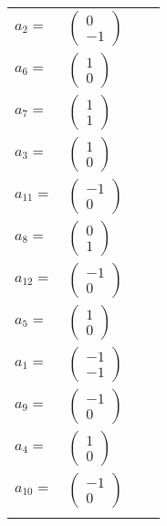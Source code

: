 \documentclass[1p]{elsarticle_modified}
\theoremstyle{definition}
\begin{document}
\begin{tabular}{m{7pt} m{180pt} m{7pt} m{180pt} }
\flushright $a_{2}=$&$\begin{pmatrix}0\\-1\end{pmatrix}$ \\
\flushright $a_{6}=$&$\begin{pmatrix}1\\0\end{pmatrix}$ \\
\flushright $a_{7}=$&$\begin{pmatrix}1\\1\end{pmatrix}$ \\
\flushright $a_{3}=$&$\begin{pmatrix}1\\0\end{pmatrix}$ \\
\flushright $a_{11}=$&$\begin{pmatrix}-1\\0\end{pmatrix}$ \\
\flushright $a_{8}=$&$\begin{pmatrix}0\\1\end{pmatrix}$ \\
\flushright $a_{12}=$&$\begin{pmatrix}-1\\0\end{pmatrix}$ \\
\flushright $a_{5}=$&$\begin{pmatrix}1\\0\end{pmatrix}$ \\
\flushright $a_{1}=$&$\begin{pmatrix}-1\\-1\end{pmatrix}$ \\
\flushright $a_{9}=$&$\begin{pmatrix}-1\\0\end{pmatrix}$ \\
\flushright $a_{4}=$&$\begin{pmatrix}1\\0\end{pmatrix}$ \\
\flushright $a_{10}=$&$\begin{pmatrix}-1\\0\end{pmatrix}$\\&\end{tabular}
\end{document}
